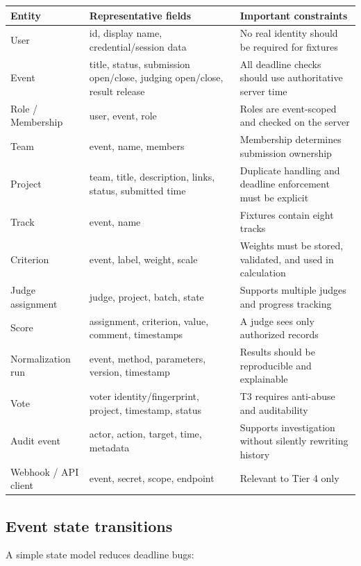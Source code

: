 \documentclass[11pt]{article}
\begin{document}
\begin{longtable}{@{}L{35mm}L{54mm}L{70mm}@{}}
\toprule
\textbf{Entity} & \textbf{Representative fields} & \textbf{Important constraints}\\
\midrule
\endhead%
User & id, display name, credential/session data & No real identity should be required for fixtures\\
Event & title, status, submission open/close, judging open/close, result release & All deadline checks should use authoritative server time\\
Role / Membership & user, event, role & Roles are event-scoped and checked on the server\\
Team & event, name, members & Membership determines submission ownership\\
Project & team, title, description, links, status, submitted time & Duplicate handling and deadline enforcement must be explicit\\
Track & event, name & Fixtures contain eight tracks\\
Criterion & event, label, weight, scale & Weights must be stored, validated, and used in calculation\\
Judge assignment & judge, project, batch, state & Supports multiple judges and progress tracking\\
Score & assignment, criterion, value, comment, timestamps & A judge sees only authorized records\\
Normalization run & event, method, parameters, version, timestamp & Results should be reproducible and explainable\\
Vote & voter identity/fingerprint, project, timestamp, status & T3 requires anti-abuse and auditability\\
Audit event & actor, action, target, time, metadata & Supports investigation without silently rewriting history\\
Webhook / API client & event, secret, scope, endpoint & Relevant to Tier 4 only\\
\bottomrule
\end{longtable}

\subsection{Event state transitions}

A simple state model reduces deadline bugs:
\end{document}
